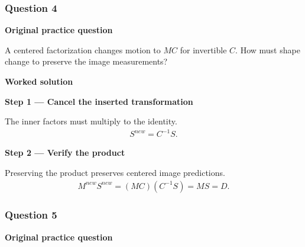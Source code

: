 \documentclass[letterpaper,11pt,english,openany,oneside]{jupyterBook}
\begin{document}
\par\medskip


\subsubsection{Question 4}
\label{\detokenize{lectures/lecture06/tldr:question-4}}
\par\medskip\textbf{Original practice question}\par\smallskip

\sphinxAtStartPar
A centered factorization changes motion to \(MC\) for invertible \(C\). How must shape change to preserve the image measurements?

\par\medskip

\par\medskip
\textbf{Worked solution}\par\smallskip

\par\medskip{}
{\color{QuizStepRed}\bfseries Step 1 — Cancel the inserted transformation}\par\smallskip

\sphinxAtStartPar
{} The inner factors must multiply to the identity.
{\color{QuizMathBlue} \begin{equation*}
\begin{split}S^{new}=C^{-1}S.\end{split}
\end{equation*}}
\par

\par\medskip{}
{\color{QuizStepRed}\bfseries Step 2 — Verify the product}\par\smallskip

\sphinxAtStartPar
{} Preserving the product preserves centered image predictions.
{\color{QuizMathBlue} \begin{equation*}
\begin{split}M^{new}S^{new}=(MC)(C^{-1}S)=MS=D.\end{split}
\end{equation*}}
\par

\par\medskip


\subsubsection{Question 5}
\label{\detokenize{lectures/lecture06/tldr:question-5}}
\par\medskip\textbf{Original practice question}\par\smallskip
\end{document}
